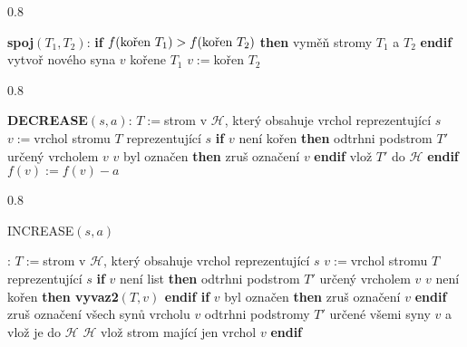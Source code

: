 \documentclass[a4paper,12pt]{article}
\newcommand{\algoritmus}[1]{
  {
  \setlength\fboxrule{0.5pt}

  \begin{boxedminipage}{0.8\textwidth}

 #1
  \end{boxedminipage}

  }
  }
\begin{document}
\algoritmus{
{\bf spoj$(T_1,T_2)$}:\newline 
{\bf \textsf{if}} $f(\text{\rm kořen }T_1)>f(\text{\rm kořen }T_2)$ {\bf \textsf{then}\newline 
\phantom{{\rm{\rm ---}}}}vyměň stromy $T_1$ a $T_2$\newline 
{\bf \textsf{endif}\newline }
vytvoř nového syna $v$ kořene $T_1$\newline 
$v:=$kořen $T_2$
}
\algoritmus{
{\bf DECREASE$(s,a)$}:\newline 
$T:=$strom v $\mathcal H$, který obsahuje vrchol reprezentující $
s$\newline 
$v:=$vrchol stromu $T$ reprezentující $s$\newline 
{\bf \textsf{if}} $v$ není kořen {\bf \textsf{then} \newline 
\phantom{{\rm ---}}}odtrhni podstrom $T'$ určený vrcholem $v$\newline 
\phantom{---}{\bf vyvaz2$(T,v)$\newline 
\phantom{{\rm ---}}\textsf{if}} $v$ byl označen {\bf \textsf{then}} zruš označení $
v$ {\bf \textsf{endif}\newline 
\phantom{{\rm ---}}}vlož $T'$ {do} $\mathcal H$\newline 
{\bf \textsf{endif}\newline 
$f(v):=f(v)-a$
}
\algoritmus{
INCREASE$(s,a)$}:\newline 
$T:=$strom v $\mathcal H$, který obsahuje vrchol reprezentující $
s$\newline 
$v:=$vrchol stromu $T$ reprezentující $s$\newline 
{\bf \textsf{if}} $v$ není list {\bf \textsf{then} \newline 
\phantom{{\rm ---}}}odtrhni podstrom $T'$ určený vrcholem $v$\newline 
\phantom{---}{\bf \textsf{if}} $v$ není kořen {\bf \textsf{then} vyvaz2$(T,v
)$ \textsf{endif}\newline 
\phantom{{\rm ---}}\textsf{if}} $v$ byl označen {\bf \textsf{then}} zruš označení $
v$ {\bf \textsf{endif}\newline 
\phantom{{\rm ---}}}zruš označení všech synů vrcholu $
v$\newline 
\phantom{---}odtrhni podstromy $T'$ určené všemi syny $v$ 
a vlož je \textsf{do} $\mathcal H$\newline 
\phantom{{\bf ---}}{do} $\mathcal H$ vlož strom mající jen vrchol $
v$\newline 
{\bf \textsf{endif}\newline 
}}
\end{document}
